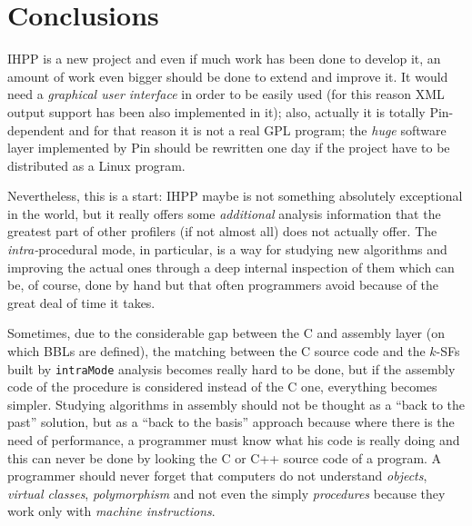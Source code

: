 \documentclass[a4paper,10pt]{report}
\begin{document}
\chapter{Conclusions}

IHPP is a new project and even if much work has been done to develop it, 
an amount of work even bigger should be done to extend and improve it.
It would need a \emph{graphical user interface} in order to be easily used
(for this reason XML output support has been also implemented in it);
also, actually it is totally Pin-dependent and for that reason it is not
a real GPL program; the \emph{huge} software layer implemented by Pin should 
be rewritten one day if the project have to be distributed as a Linux program.

Nevertheless, this is a start: IHPP maybe is not something absolutely exceptional
in the world, but it really offers some \emph{additional} analysis information that
the greatest part of other profilers (if not almost all) does not actually offer. 
The \emph{intra-}procedural mode, in particular, is a way for studying new algorithms 
and improving the actual ones through a deep internal inspection of them 
which can be, of course, done by hand but that often programmers avoid because of the 
great deal of time it takes.

Sometimes, due to the considerable gap between the C
and assembly layer (on which BBLs are defined), 
the matching between the C source code and the $k$-SFs built by \verb|intraMode| analysis
becomes really hard to be done, but if the assembly code of the procedure is considered instead of
the C one, everything becomes simpler. 
Studying algorithms in assembly should not be
thought as a ``back to the past'' solution, but as a ``back to the basis'' approach
because where there is the need of performance, a programmer must know what 
his code is really doing and this can never be done 
by looking the C or C++ source code of a program. 
A programmer should never forget that computers do not understand
 \emph{objects}, \emph{virtual classes}, \emph{polymorphism} and not even the simply \emph{procedures} because they work only with \emph{machine instructions}.


{}

\end{document}
